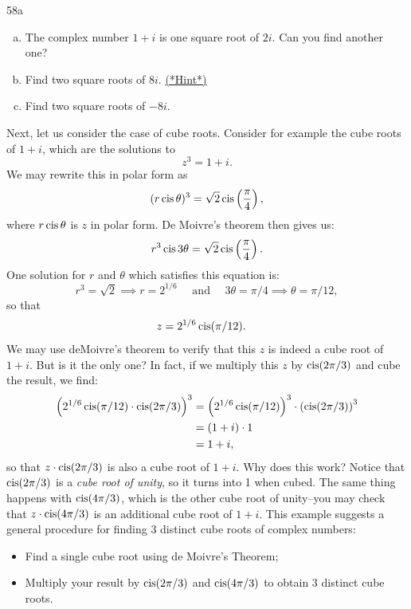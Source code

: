 \begin{exercise}{58a}
\begin{enumerate}[(a)]
\item
 The complex number $1 + i$ is one square root of $2i$. Can you find another one?
\item
Find two square roots of $8i$.
\hyperref[sec:complex:hints]{(*Hint*)}
\item
Find two square roots of $-8i$.
\end{enumerate}
\end{exercise}

Next, let us consider the case of cube roots. Consider for example the cube roots of $1 + i$, which are the solutions to
\[ z^3 = 1 + i. \]
We  may rewrite this in polar form as
\[ (r \operatorname{cis} \theta)^3 = \sqrt{2} \operatorname{cis}\left(\frac{\pi}{4}\right), \]
where $r \operatorname{cis} \theta$ is $z$ in polar form. De Moivre's theorem then gives us:
\[ r^3 \operatorname{cis} 3\theta = \sqrt{2} \operatorname{cis}\left(\frac{\pi}{4}\right). \]
One solution for $r$ and $\theta$ which satisfies this equation is:
\[ r^3 = \sqrt{2} \implies r=2^{1/6} \quad \textrm{ and } \quad 3\theta = \pi/4 \implies \theta = \pi/12, \]
so that
\begin{align*}
z &=  2^{1/6} \operatorname{cis}(\pi/12).
\end{align*}
We may use deMoivre's theorem to verify that this $z$ is indeed a cube root of $1+i$.  But is it the only one?
 In fact, if we multiply this $z$ by $\operatorname{cis}(2 \pi/3)$ and cube the result, we find:
\begin{align*}
 \left( 2^{1/6} \operatorname{cis}(\pi/12) \cdot \operatorname{cis}(2\pi/3) \right)^3 &= \left( 2^{1/6} \operatorname{cis}(\pi/12) \right)^3 \cdot \left(\operatorname{cis}(2\pi/3) \right)^3 \\
&= (1+i) \cdot 1 \\
&= 1+i,
\end{align*}
so that $z \cdot \operatorname{cis}(2\pi/3)$ is also a cube root of $1+i$.  Why does this work? Notice that $\operatorname{cis}(2\pi/3)$ is a \emph{cube root of unity}, so it turns into 1 when cubed. The same thing happens with $\operatorname{cis}(4\pi/3)$, which is the other cube root of unity--you may check that $z \cdot \operatorname{cis}(4\pi/3)$ is an additional cube root of $1+i$.
This example suggests a general procedure for finding $3$ distinct cube roots of complex numbers:
\begin{itemize}
\item Find a single cube root using de Moivre's Theorem;
\item Multiply your result by $ \operatorname{cis}(2\pi/3)$  and $ \operatorname{cis}(4\pi/3)$ to obtain $3$ distinct cube roots.
\end{itemize}

